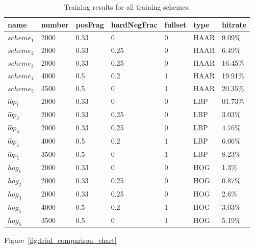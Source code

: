 \documentclass{llncs}
\begin{document}
{		\begin{table}[H]
			\centering
			\caption{Training results for all training schemes.}
			\label{tab:training_results}
			\begin{tabularx}{\textwidth}{XXXlXXX}
				\toprule
				\textbf{name} & \textbf{number} & \textbf{posFrag} & \textbf{hardNegFrac} & \textbf{fullset} & \textbf{type} & \textbf{hitrate} \\
				\midrule
					\(scheme_1\) & 2000 & 0.33 & 0 & 0 & HAAR & 9.09\% \\
					\(scheme_2\) & 2000 & 0.33 & 0.25 & 0 & HAAR & 6.49\% \\
					\(scheme_3\) & 2000 & 0.33 & 0.25 & 0 & HAAR & 16.45\% \\
					\(scheme_4\) & 4000 & 0.5 & 0.2 & 1 & HAAR & 19.91\% \\
					\(scheme_5\) & 3500 & 0.5 & 0 & 1 & HAAR & 20.35\% \\
					\(lbp_1\) & 2000 & 0.33 & 0 & 0 & LBP & 01.73\% \\
					\(lbp_2\) & 2000 & 0.33 & 0.25 & 0 & LBP & 3.03\% \\
					\(lbp_3\) & 2000 & 0.33 & 0.25 & 0 & LBP & 4.76\% \\
					\(lbp_4\) & 4000 & 0.5 & 0.2 & 1 & LBP & 6.06\% \\
					\(lbp_5\) & 3500 & 0.5 & 0 & 1 & LBP & 8.23\% \\
					\(hog_1\) & 2000 & 0.33 & 0 & 0 & HOG & 1.3\% \\
					\(hog_2\) & 2000 & 0.33 & 0.25 & 0 & HOG & 0.87\% \\
					\(hog_3\) & 2000 & 0.33 & 0.25 & 0 & HOG & 2.6\% \\
					\(hog_4\) & 4000 & 0.5 & 0.2 & 1 & HOG & 3.03\% \\
					\(hog_5\) & 3500 & 0.5 & 0 & 1 & HOG & 5.19\% \\
				\bottomrule
			\end{tabularx}
		\end{table}

		Figure~\ref{fig:trial_comparison_chart}

}
\end{document}
